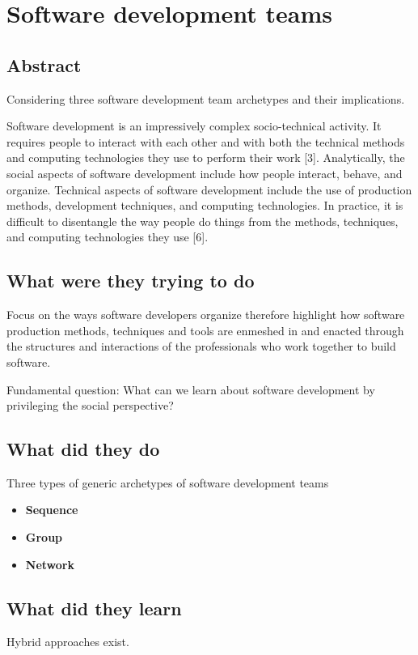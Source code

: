 \section{Software development teams}

\subsection{Abstract}

Considering three software development team archetypes and their implications.

Software development is an impressively complex socio-technical activity. It requires people to interact with each other and with both the technical methods and computing technologies they use to perform their work [3]. Analytically, the social aspects of software development include how people interact, behave, and organize. Technical aspects of software development include the use of production methods, development techniques, and computing technologies. In practice, it is difficult to disentangle the way people do things from the methods, techniques, and computing technologies they use [6].

\subsection{What were they trying to do}

Focus on the ways software developers organize therefore highlight how software production methods, techniques and tools are enmeshed in and enacted through the structures and interactions of the professionals who work together to build software.

Fundamental question: What can we learn about software development by privileging the social perspective?

\subsection{What did they do}

Three types of generic archetypes of software development teams

\begin{itemize}
    \item \textbf{Sequence}
    \item \textbf{Group}
    \item \textbf{Network}
\end{itemize}

\subsection{What did they learn}

Hybrid approaches exist.
